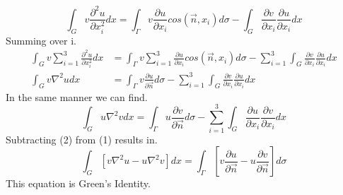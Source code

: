 \documentclass[]{article}
\begin{document}
\[
    \int_G v\frac{\partial^2 u}{\partial x_{i}^{2}} dx = \int_\Gamma v\frac{\partial u}{\partial x_i}cos(\vec{n},x_i) d\sigma - \int_G \frac{\partial v}{\partial x_i}\frac{\partial u}{\partial x_i} dx    
\]
Summing over i.
\begin{align}
\int_G v\sum_{i=1}^{3}\frac{\partial^2 u}{\partial x_{i}^{2}} dx &= \int_\Gamma v\sum_{i=1}^{3}\frac{\partial u}{\partial x_i}cos(\vec{n},x_i) d\sigma - \sum_{i=1}^{3}\int_G \frac{\partial v}{\partial x_i}\frac{\partial u}{\partial x_i} dx 
\nonumber
\\ 
\int_G v\nabla^2 u dx &= \int_\Gamma v\frac{\partial u}{\partial \vec{n}} d\sigma - \sum_{i=1}^{3}\int_G \frac{\partial v}{\partial x_i}\frac{\partial u}{\partial x_i} dx
\end{align}
In the same manner we can find.
\begin{equation}
\int_G u\nabla^2 v dx = \int_\Gamma u\frac{\partial v}{\partial \vec{n}} d\sigma - \sum_{i=1}^{3}\int_G \frac{\partial u}{\partial x_i}\frac{\partial v}{\partial x_i} dx
\end{equation}
Subtracting (2) from (1) results in.
\[
    \int_G \left[v\nabla^2 u - u\nabla^2 v\right]dx = \int_\Gamma \left[v\frac{\partial u}{\partial \vec{n}}-u\frac{\partial v}{\partial \vec{n}}\right] d\sigma    
\]
This equation is Green's Identity.
\end{document}
